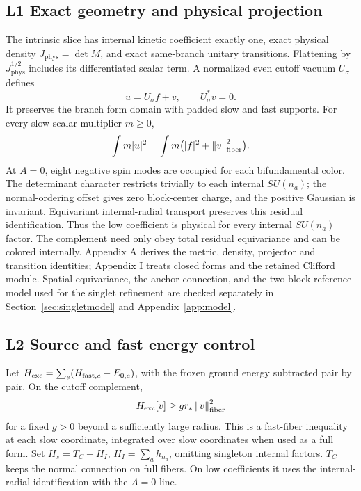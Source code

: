 \documentclass[11pt,letterpaper]{article}
\theoremstyle{definition}\newtheorem{hypothesis}[theorem]{Hypothesis}
\newcommand{\phys}{\mathrm{phys}}
\newcommand{\exc}{\mathrm{exc}}
\newcommand{\norm}[1]{\left\lVert #1\right\rVert}
\numberwithin{equation}{section}
\begin{document}
\subsection{L1 Exact geometry and physical projection}
The intrinsic slice has internal kinetic coefficient exactly one, exact physical density $J_{\phys}=\det M$, and exact same-branch unitary transitions. Flattening by $J_{\phys}^{1/2}$ includes its differentiated scalar term. A normalized even cutoff vacuum $U_\sigma$ defines
\begin{equation}
 u=U_\sigma f+v,\qquad U_\sigma^*v=0.\label{eq:decomp}
\end{equation}
It preserves the branch form domain with padded slow and fast supports. For every slow scalar multiplier $m\ge0$,
\begin{equation}
 \int m|u|^2=\int m\bigl(|f|^2+\norm{v}_{\rm fiber}^2\bigr).\label{eq:masssplit}
\end{equation}
At $A=0$, eight negative spin modes are occupied for each bifundamental color. The determinant character restricts trivially to each internal $SU(n_a)$; the normal-ordering offset gives zero block-center charge, and the positive Gaussian is invariant. Equivariant internal-radial transport preserves this residual identification. Thus the low coefficient is physical for every internal $SU(n_a)$ factor. The complement need only obey total residual equivariance and can be colored internally. Appendix A derives the metric, density, projector and transition identities; Appendix I treats closed forms and the retained Clifford module. Spatial equivariance, the anchor connection, and the two-block reference model used for the singlet refinement are checked separately in Section~\ref{sec:singletmodel} and Appendix~\ref{app:model}.

\subsection{L2 Source and fast energy control}
Let $H_{\exc}=\sum_e(H_{{\rm fast},e}-E_{0,e})$, with the frozen ground energy subtracted pair by pair. On the cutoff complement,
\begin{equation}
 H_{\exc}[v]\ge g r_*\norm{v}_{\rm fiber}^2\label{eq:gap}
\end{equation}
for a fixed $g>0$ beyond a sufficiently large radius. This is a fast-fiber inequality at each slow coordinate, integrated over slow coordinates when used as a full form. Set $H_s=T_C+H_I$, $H_I=\sum_ah_{n_a}$, omitting singleton internal factors. $T_C$ keeps the normal connection on full fibers. On low coefficients it uses the internal-radial identification with the $A=0$ line.
\end{document}
